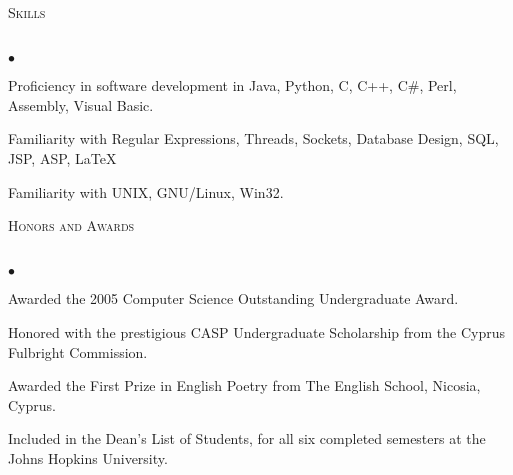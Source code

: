 \documentclass{article}
\newcommand{\lineunder}{\vspace*{-8pt} \\ \hspace*{-18pt} \hrulefill \\}
\newcommand{\header}[1]{{\hspace*{-15pt}\vspace*{6pt} \textsc{#1}} \vspace*{-6pt} \lineunder}
\newenvironment{achievements}{\begin{list}{$\bullet$}{\topsep 0pt \itemsep -2pt}}{\vspace*{4pt}\end{list}}
\begin{document}
\header{Skills}
\begin{achievements}
\item Proficiency in software development in Java, Python, C, C++, C\#, Perl, Assembly, Visual Basic.
\item Familiarity with Regular Expressions, Threads, Sockets, Database Design, SQL, JSP, ASP, \LaTeX
\item Familiarity with UNIX, GNU/Linux, Win32.
\end{achievements}

\header{Honors and Awards}
\begin{achievements}
\item  Awarded the 2005 Computer Science Outstanding Undergraduate Award.
\item Honored with the prestigious CASP Undergraduate Scholarship from the Cyprus Fulbright Commission.
\item  Awarded the First Prize in English Poetry from The English School, Nicosia, Cyprus.
\item Included in the Dean's List of Students, for all six completed semesters at the Johns Hopkins University.
\end{achievements}
\end{document}
